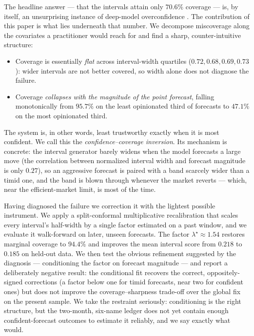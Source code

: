 \documentclass[11pt,a4paper]{article}
\begin{document}
The headline answer --- that the intervals attain only $70.6\%$ coverage --- is, by
itself, an unsurprising instance of deep-model overconfidence \cite{guo2017,
lakshminarayanan2017}. The contribution of this paper is what lies underneath that
number. We decompose miscoverage along the covariates a practitioner would reach for
and find a sharp, counter-intuitive structure:
\begin{itemize}[leftmargin=1.4em,itemsep=2pt]
\item Coverage is essentially \emph{flat} across interval-width quartiles
($0.72,0.68,0.69,0.73$): wider intervals are not better covered, so width alone does
not diagnose the failure.
\item Coverage \emph{collapses with the magnitude of the point forecast}, falling
monotonically from $95.7\%$ on the least opinionated third of forecasts to $47.1\%$
on the most opinionated third.
\end{itemize}
The system is, in other words, least trustworthy exactly when it is most confident.
We call this the \emph{confidence--coverage inversion}. Its mechanism is concrete:
the interval generator barely widens when the model forecasts a large move (the
correlation between normalized interval width and forecast magnitude is only $0.27$),
so an aggressive forecast is paired with a band scarcely wider than a timid one, and
the band is blown through whenever the market reverts --- which, near the
efficient-market limit, is most of the time.

Having diagnosed the failure we correction it with the lightest possible instrument.
We apply a split-conformal multiplicative recalibration that scales every interval's
half-width by a single factor estimated on a past window, and we evaluate it
walk-forward on later, unseen forecasts. The factor $\lambda^\star \approx 1.54$
restores marginal coverage to $94.4\%$ and improves the mean interval score from
$0.218$ to $0.185$ on held-out data. We then test the obvious refinement suggested
by the diagnosis --- conditioning the factor on forecast magnitude --- and report a
deliberately negative result: the conditional fit recovers the correct,
oppositely-signed corrections (a factor below one for timid forecasts, near two for
confident ones) but does not improve the coverage--sharpness trade-off over the
global fix on the present sample. We take the restraint seriously: conditioning is
the right structure, but the two-month, six-name ledger does not yet contain enough
confident-forecast outcomes to estimate it reliably, and we say exactly what would.
\end{document}
